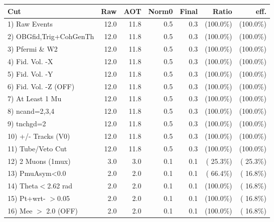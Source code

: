  \begin{table}[h!]\centering
 \begin{tabular}{||l||r|r|r|r|r|r||}
 \hline
 \hline
 Cut & Raw & AOT & Norm0 & Final & Ratio & eff.       \\
 \hline
  1) Raw Events           &         12.0 &         11.8 &          0.5 &          0.3 & (100.0\%) & (100.0\%) \\
  2) OBGfid,Trig+CohGenTh &         12.0 &         11.8 &          0.5 &          0.3 & (100.0\%) & (100.0\%) \\
  3) Pfermi \& W2         &         12.0 &         11.8 &          0.5 &          0.3 & (100.0\%) & (100.0\%) \\
  4) Fid. Vol. -X         &         12.0 &         11.8 &          0.5 &          0.3 & (100.0\%) & (100.0\%) \\
  5) Fid. Vol. -Y         &         12.0 &         11.8 &          0.5 &          0.3 & (100.0\%) & (100.0\%) \\
  6) Fid. Vol. -Z (OFF)   &         12.0 &         11.8 &          0.5 &          0.3 & (100.0\%) & (100.0\%) \\
  7) At Least 1 Mu        &         12.0 &         11.8 &          0.5 &          0.3 & (100.0\%) & (100.0\%) \\
  8) ncand=2,3,4          &         12.0 &         11.8 &          0.5 &          0.3 & (100.0\%) & (100.0\%) \\
  9) tnchgd=2             &         12.0 &         11.8 &          0.5 &          0.3 & (100.0\%) & (100.0\%) \\
 10) +/- Tracks (V0)      &         12.0 &         11.8 &          0.5 &          0.3 & (100.0\%) & (100.0\%) \\
 11) Tube/Veto Cut        &         12.0 &         11.8 &          0.5 &          0.3 & (100.0\%) & (100.0\%) \\
 12) 2 Muons (1mux)       &          3.0 &          3.0 &          0.1 &          0.1 & ( 25.3\%) & ( 25.3\%) \\
 13) PmuAsym<0.0          &          2.0 &          2.0 &          0.1 &          0.1 & ( 66.4\%) & ( 16.8\%) \\
 14) Theta$<$2.62 rad     &          2.0 &          2.0 &          0.1 &          0.1 & (100.0\%) & ( 16.8\%) \\
 15) Pt+wrt- $>$0.05      &          2.0 &          2.0 &          0.1 &          0.1 & (100.0\%) & ( 16.8\%) \\
 16) Mee $>$ 2.0  (OFF)   &          2.0 &          2.0 &          0.1 &          0.1 & (100.0\%) & ( 16.8\%) \\

\end{tabular}
\end{table}
